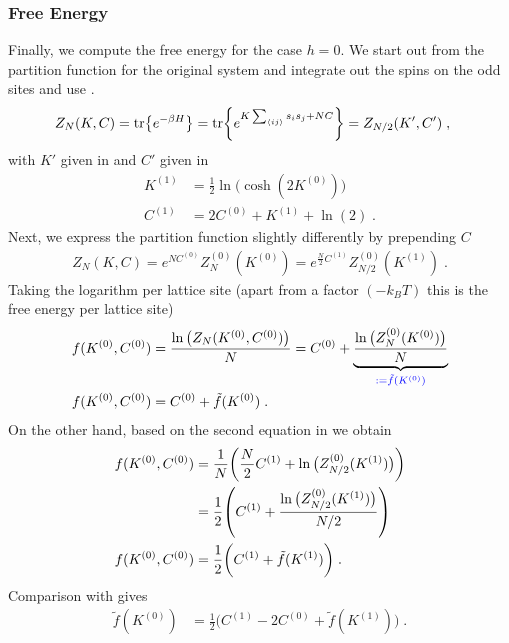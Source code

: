 \subsubsection{Free Energy}
Finally, we compute the free energy for the case $h=0$. We start out from the partition function for the original system
and integrate out the spins on the odd sites and use  .
%
\begin{align*}
Z_{N}(K,C)&= \tr{e^{-\beta H}}
= \tr{e^{K\sum_{\langle ij \rangle}s_{i}s_{j}+N C}}=Z_{N/2}(K',C')\;,
\end{align*}
%
with $K'$ given in  and $C'$ given in 
%
\begin{align}\label{eq:renorm:C}
K^{(1)} &= \frac{1}{2}\ln\bigg(\cosh(2K^{(0)})\bigg)\\
C^{(1)}&= 2 C^{(0)} + K^{(1)} + \ln(2) \;.\label{eq:renorm:Cp}
\end{align}
%
Next, we express the partition function slightly differently by prepending $C$
%
\begin{align}\label{eq:Z:N:aux}
Z_{N}(K,C) = e^{N C^{(0)}} Z^{(0)}_{N}(K^{(0)}) = e^{\frac{N}{2} C^{(1)}} Z^{(0)}_{N/2}(K^{(1)})\;.
\end{align}
%
Taking the logarithm per lattice site (apart from a factor $(-k_{B}T)$ this is the free energy per lattice site)
%
\begin{align}
f(K^{(0)},C^{(0)})&=\frac{\ln\big(Z_{N}(K^{(0)},C^{(0)})\big)}{N} = C^{(0)} + \underbrace{
\frac{\ln\big(Z^{(0)}_{N}(K^{(0)})\big)}{N}
}_{\color{blue} := \tilde f(K^{(0)})}\notag\\
f(K^{(0)},C^{(0)})&= C^{(0)} + \tilde f(K^{(0)}) \;.\label{eq:f:K}
\end{align}
%
On the other hand, based on the second equation in  we obtain
%
\begin{align*}
f(K^{(0)},C^{(0)})
&= \frac{1}{N}\bigg( \frac{N}{2} C^{(1)} + \ln\big(Z^{(0)}_{N/2}(K^{(1)})  \big) \bigg)\\
&=\frac{1}{2} \qty( C^{(1)} + \frac{\ln\big(Z^{(0)}_{N/2}(K^{(1)})  \big)}{N/2} )\\
f(K^{(0)},C^{(0)})&=\frac{1}{2}\bigg( C^{(1)} + \tilde f(K^{(1)}) \bigg)\;.
\end{align*}
%
Comparison  with  gives
%
\begin{align*}
 \tilde f(K^{(0)}) &=\frac{1}{2}\bigg( C^{(1)}-2 C^{(0)} + \tilde f(K^{(1)}) \bigg)\;.
\end{align*}
